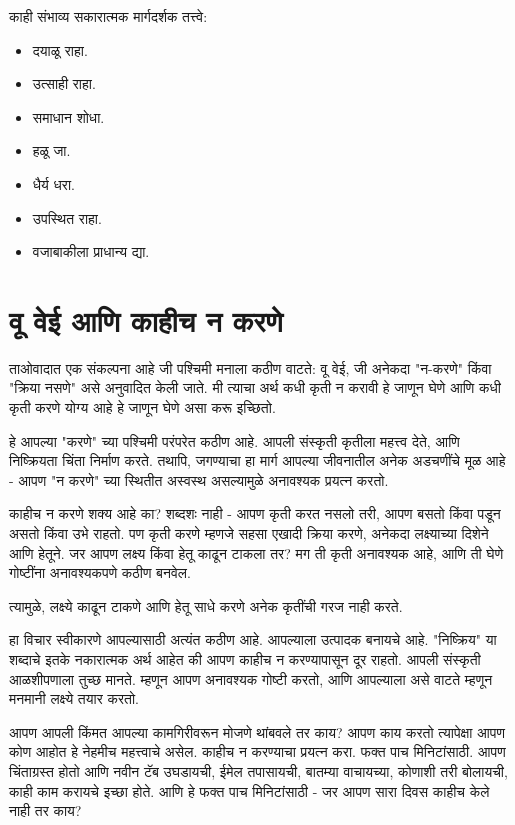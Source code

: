 काही संभाव्य सकारात्मक मार्गदर्शक तत्त्वे:
\begin{itemize}
\item दयाळू राहा.
\item उत्साही राहा.
\item समाधान शोधा.
\item हळू जा.
\item धैर्य धरा.
\item उपस्थित राहा.
\item वजाबाकीला प्राधान्य द्या.
\end{itemize}

\chapter{ वू वेई आणि काहीच न करणे}

ताओवादात एक संकल्पना आहे जी पश्चिमी मनाला कठीण वाटते: वू वेई, जी अनेकदा "न-करणे" किंवा "क्रिया नसणे" असे अनुवादित केली जाते. मी त्याचा अर्थ कधी कृती न करावी हे जाणून घेणे आणि कधी कृती करणे योग्य आहे हे जाणून घेणे असा करू इच्छितो.

हे आपल्या "करणे" च्या पश्चिमी परंपरेत कठीण आहे. आपली संस्कृती कृतीला महत्त्व देते, आणि निष्क्रियता चिंता निर्माण करते. तथापि, जगण्याचा हा मार्ग आपल्या जीवनातील अनेक अडचणींचे मूळ आहे - आपण "न करणे" च्या स्थितीत अस्वस्थ असल्यामुळे अनावश्यक प्रयत्न करतो.

काहीच न करणे शक्य आहे का? शब्दशः नाही - आपण कृती करत नसलो तरी, आपण बसतो किंवा पडून असतो किंवा उभे राहतो. पण कृती करणे म्हणजे सहसा एखादी क्रिया करणे, अनेकदा लक्ष्याच्या दिशेने आणि हेतूने. जर आपण लक्ष्य किंवा हेतू काढून टाकला तर? मग ती कृती अनावश्यक आहे, आणि ती घेणे गोष्टींना अनावश्यकपणे कठीण बनवेल.

त्यामुळे, लक्ष्ये काढून टाकणे आणि हेतू साधे करणे अनेक कृतींची गरज नाही करते.

हा विचार स्वीकारणे आपल्यासाठी अत्यंत कठीण आहे. आपल्याला उत्पादक बनायचे आहे. "निष्क्रिय" या शब्दाचे इतके नकारात्मक अर्थ आहेत की आपण काहीच न करण्यापासून दूर राहतो. आपली संस्कृती आळशीपणाला तुच्छ मानते. म्हणून आपण अनावश्यक गोष्टी करतो, आणि आपल्याला असे वाटते म्हणून मनमानी लक्ष्ये तयार करतो.

आपण आपली किंमत आपल्या कामगिरीवरून मोजणे थांबवले तर काय? आपण काय करतो त्यापेक्षा आपण कोण आहोत हे नेहमीच महत्त्वाचे असेल. काहीच न करण्याचा प्रयत्न करा. फक्त पाच मिनिटांसाठी. आपण चिंताग्रस्त होतो आणि नवीन टॅब उघडायची, ईमेल तपासायची, बातम्या वाचायच्या, कोणाशी तरी बोलायची, काही काम करायचे इच्छा होते. आणि हे फक्त पाच मिनिटांसाठी - जर आपण सारा दिवस काहीच केले नाही तर काय?

